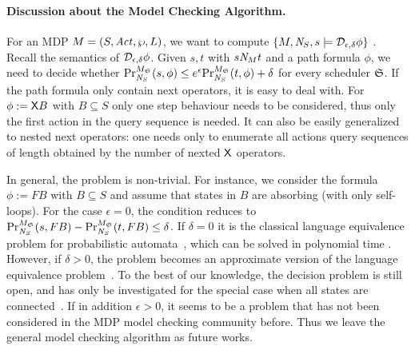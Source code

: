 \paragraph{Discussion about the Model Checking Algorithm.}
For an MDP $M =
(S, \Act, \wp, L)$, we want to compute $\{ M, \neighbor{S}, s \models
\dpriv{\epsilon}{\delta} \phi \}$ . Recall the semantics of $\dpriv{\epsilon}{\delta}
\phi$. Given $s, t$ with $s \neighbor{M} t$ and a path formula
$\phi$, we need to decide whether
$\myPr{s}{M_{\scheduler{S}}}{\neighbor{S}}{\phi} \leq
e^{\epsilon} \myPr{t}{M_{\scheduler{S}}}{\neighbor{S}}{\phi} + \delta$
for every scheduler $\scheduler{S}$.
If the path formula only contain next operators, it is easy to deal with. For $\phi:=\X B$ with $B\subseteq S$ only one step behaviour needs to be considered, thus only the first action in the query sequence is needed. It can also be easily generalized to nested next operators:  one needs only to enumerate
all actions query sequences of length obtained by the number of nexted $\X$ operators.

In general, the problem is non-trivial. For instance, we consider the formula $\phi:=F B$ with $B\subseteq S$ and assume that states in $B$ are absorbing (with only self-loops). For the case $\epsilon=0$, the condition reduces to
$\myPr{s}{M_{\scheduler{S}}}{\neighbor{S}}{F B} -
\myPr{t}{M_{\scheduler{S}}}{\neighbor{S}}{F B}\le \delta$. If $\delta=0$ it is the classical language equivalence problem for probabilistic automata~\cite{Rabin63}, which can be solved in polynomial time \cite{Tzeng92}. However, if $\delta>0$, the problem
becomes an approximate version of the language equivalence problem~\cite{Tzeng92}. To the best of our knowledge, the decision problem is still open, and has only be investigated for the special case when all states are connected~\cite{Tzeng92}. If in addition $\epsilon>0$, it seems to be a problem that has not been considered in the MDP model checking community before. Thus we leave the general model checking algorithm as future works. 

